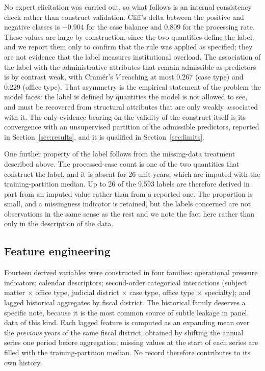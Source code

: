 \documentclass[sn-vancouver,Numbered]{sn-jnl}
\begin{document}
No expert elicitation was carried out, so what follows is an internal consistency check rather than construct validation. Cliff's delta between the positive and negative classes is $-0.904$ for the case balance and $0.809$ for the processing rate. These values are large by construction, since the two quantities define the label, and we report them only to confirm that the rule was applied as specified; they are not evidence that the label measures institutional overload. The association of the label with the administrative attributes that remain admissible as predictors is by contrast weak, with Cram\'er's $V$ reaching at most 0.267 (case type) and 0.229 (office type). That asymmetry is the empirical statement of the problem the model faces: the label is defined by quantities the model is not allowed to see, and must be recovered from structural attributes that are only weakly associated with it. The only evidence bearing on the validity of the construct itself is its convergence with an unsupervised partition of the admissible predictors, reported in Section~\ref{sec:results}, and it is qualified in Section~\ref{sec:limits}.

One further property of the label follows from the missing-data treatment described above. The processed-case count is one of the two quantities that construct the label, and it is absent for 26 unit-years, which are imputed with the training-partition median. Up to 26 of the 9{,}593 labels are therefore derived in part from an imputed value rather than from a reported one. The proportion is small, and a missingness indicator is retained, but the labels concerned are not observations in the same sense as the rest and we note the fact here rather than only in the description of the data.

\subsection{Feature engineering}

Fourteen derived variables were constructed in four families: operational pressure indicators; calendar descriptors; second-order categorical interactions (subject matter $\times$ office type, judicial district $\times$ case type, office type $\times$ specialty); and lagged historical aggregates by fiscal district. The historical family deserves a specific note, because it is the most common source of subtle leakage in panel data of this kind. Each lagged feature is computed as an expanding mean over the \emph{previous} years of the same fiscal district, obtained by shifting the annual series one period before aggregation; missing values at the start of each series are filled with the training-partition median. No record therefore contributes to its own history.
\end{document}
